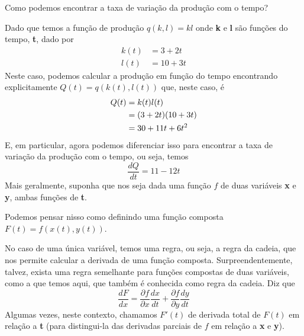 \documentclass[a4paper]{article}
\begin{document}
\par Como podemos encontrar a taxa de variação da produção com o tempo?
\par Dado que temos a função de produção $q(k,l)=kl$ onde \textbf{k} e \textbf{l} são funções do tempo, \textbf{t}, dado por
\begin{equation}
    \begin{split}        
        k(t) & = 3 + 2t \\
        l(t) & = 10 + 3t
    \end{split}
\end{equation}
Neste caso, podemos calcular a produção em função do tempo encontrando explicitamente $Q(t) = q(k(t),l(t))$ que, neste caso, é
\begin{equation}
    \begin{split}        
        Q(t) & = k(t)l(t) \\
         & = (3 + 2t)(10 + 3t) \\
         & = 30 + 11t + 6t\textsuperscript{2}
    \end{split}
\end{equation}
E, em particular, agora podemos diferenciar isso para encontrar a taxa de variação da produção com o tempo, ou seja, temos
\begin{equation}
    \frac{dQ}{dt} = 11 - 12t
\end{equation}
Mais geralmente, suponha que nos seja dada uma função $f$ de duas variáveis \textbf{x} e \textbf{y}, ambas funções de \textbf{t}.
\par Podemos pensar nisso como definindo uma função composta $F(t) = f(x(t),y(t))$.
\par No caso de uma única variável, temos uma regra, ou seja, a regra da cadeia, que nos permite calcular a derivada de uma função composta. Surpreendentemente, talvez, exista uma regra semelhante para funções compostas de duas variáveis, como a que temos aqui, que também é conhecida como regra da cadeia. Diz que
\begin{equation}
    \frac{dF}{dx} = \frac{\partial f}{\partial x}\frac{dx}{dt} + \frac{\partial f}{\partial y}\frac{dy}{dt}
\end{equation}
Algumas vezes, neste contexto, chamamos $F'(t)$ de derivada total de $F(t)$ em relação a \textbf{t} (para distingui-la das derivadas parciais de $f$ em relação a \textbf{x} e \textbf{y}).
\end{document}
